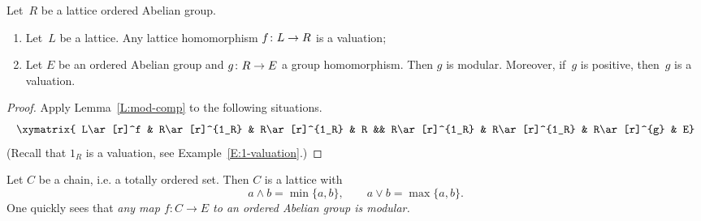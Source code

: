 \documentclass[main.tex]{subfiles}
\begin{document}
\begin{cor}
\label{C:hom-val}
Let~$R$ be a lattice ordered Abelian group.
\begin{enumerate}
\item
\label{C:hom-val-lat}
Let~$L$ be a lattice.
Any lattice homomorphism $f\colon L\rightarrow R$ 
is a valuation;

\item
\label{C:hom-val-group}
Let $E$ be an ordered Abelian group
and $g\colon R\rightarrow E$ a group homomorphism.
Then $g$ is modular.
Moreover,
if~$g$ is positive,
then~$g$ is a valuation.
\end{enumerate}
\end{cor}
\begin{proof}
Apply Lemma~\ref{L:mod-comp} to the following situations.
\begin{equation*}
\xymatrix{
L\ar[r]^f &
R\ar[r]^{1_R} &
R\ar[r]^{1_R} &
R &&
R\ar[r]^{1_R} &
R\ar[r]^{1_R} &
R\ar[r]^{g} &
E}
\end{equation*}
(Recall that $1_R$ is a valuation,
see Example~\ref{E:1-valuation}.)
\end{proof}


\begin{ex}
Let $C$ be a chain,
i.e. a totally ordered set.
Then $C$ is a lattice with
\begin{equation*}
a\wedge b = \min\{a,b\},
 \qquad 
a\vee b = \max\{a,b\}.
\end{equation*}
One quickly sees that
\emph{any map $f\colon C\rightarrow E$
to an ordered Abelian group is modular.}
\end{ex}

%
%
%
%
\end{document}
